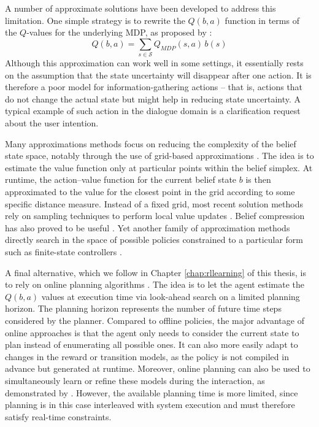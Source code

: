 A number of approximate solutions have been developed to address this limitation.  One simple strategy is to rewrite the $Q(b,a)$ function in terms of the $Q$-values for the underlying MDP, as proposed by \cite{Littman:1997}:
\begin{equation}
Q(b,a) = \sum_{s \in \mathcal{S}} Q_{\mathit{MDP}} (s,a)\, b(s)
\end{equation}
Although this approximation can work well in some settings, it essentially rests on the assumption that the state uncertainty will disappear after one action.  It is therefore a poor model for information-gathering actions -- that is, actions that do not change the actual state but might help in reducing state uncertainty. A typical example of such action in the dialogue domain is a clarification request about the user intention.

Many approximations methods focus on reducing the complexity of the belief state space, notably through the use of grid-based approximations \citep{Zhou:2001}.  The idea is to estimate the value function only at particular points within the belief simplex. At runtime, the action--value function for the current belief state $b$ is then approximated to the value for the closest point in the grid according to some specific distance measure. Instead of a fixed grid, most recent solution methods rely on sampling techniques to perform local value updates \citep{Pineau_2003,KurHsu08,shani2013}. Belief compression has also proved to be useful \citep{Roy:2005}.  Yet another family of approximation methods directly search in the space of possible policies constrained to a particular form such as finite-state controllers \citep{Hansen98}. 

A final alternative, which we follow in Chapter \ref{chap:rllearning} of this thesis, is to rely on online planning algorithms \citep{ross2008,NIPS2010_0740}.  The idea is to let the agent estimate the $Q(b,a)$ values at execution time via look-ahead search on a limited planning horizon. The planning horizon represents the number of future time steps considered by the planner.  Compared to offline policies, the major advantage of online approaches is that the agent only needs to consider the current state to plan instead of enumerating all possible ones. It can also more easily adapt to changes in the reward or transition models, as the policy is not compiled in advance but generated at runtime. Moreover, online planning can also be used to simultaneously learn or refine these models during the interaction, as demonstrated by \cite{Ross:2011}.  However, the available planning time is more limited, since planning is in this case interleaved with system execution and must therefore satisfy real-time constraints. %

